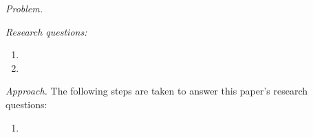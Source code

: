 \emph{Problem.}

\emph{Research questions:}
\begin{enumerate}
    \item  
    \item 
\end{enumerate}

\emph{Approach.}
The following steps are taken to answer this paper's research questions: 
\begin{enumerate}
    \item 
\end{enumerate}